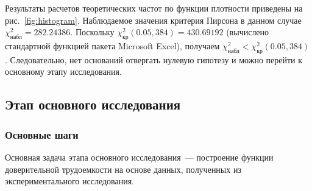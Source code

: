 \documentclass[a4paper, article, 12pt]{extarticle}
\begin{document}
Результаты расчетов теоретических частот по функции плотности приведены на рис.~\ref{fig:histogram}. Наблюдаемое значения критерия Пирсона в данном случае $\chi_{\text{набл}}^2 = 282.24386$. Поскольку $\chi_{\text{кр}}^2(0.05, 384) = 430.69192$ (вычислено стандартной функцией пакета Microsoft Excel), получаем $\chi_{\text{набл}}^2 < \chi_{\text{кр}}^2(0.05, 384)$. Следовательно, нет оснований отвергать нулевую гипотезу и можно перейти к основному этапу исследования.

\subsection{Этап основного исследования}\label{sec:analysis_part_2}

\subsubsection{Основные шаги}\label{subsec:analysis_part_2_intro}

Основная задача этапа основного исследования~--- построение функции доверительной трудоемкости на основе данных, полученных из экспериментального исследования.
\end{document}
